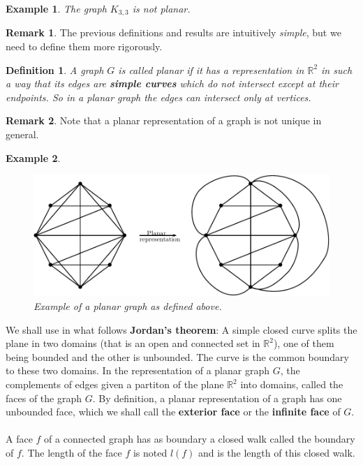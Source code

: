 \documentclass[12pt,a4paper]{article}
\newtheorem{defn}{Definition}[section]
\newtheorem{exmp}{Example}[section]
\theoremstyle{definition}
\newtheorem{rem}{Remark}[section]
\begin{document}
\newpage
\begin{exmp} The graph $K_{3,3}$ is not planar.
\end{exmp}
\begin{rem}The previous definitions and results are intuitively \textit{simple}, but we need to define them more rigorously.
\end{rem}
\begin{defn} A graph $G$ is called planar if it has a representation in $\mathbb{R}^2$ in such a way that its edges are \textbf{simple curves} which do not intersect except at their endpoints. So in a planar graph the edges can intersect only at vertices. 
\end{defn}
\begin{rem} Note that a planar representation of a graph is not unique in general. 
\end{rem}
\begin{exmp} \
\begin{figure}[hbtp]
\centering
\includegraphics[scale=.8]{images/graph48.pdf}
\caption{Example of a planar graph as defined above.}
\end{figure}
\end{exmp}
We shall use in what follows \textbf{Jordan's theorem}: A simple closed curve splits the plane in two domains (that is an open and connected set  in $\mathbb{R}^2$), one of them being bounded and the other is unbounded. The curve is the common boundary to these two domains. In the representation of a planar graph $G$, the complements of edges given a partiton of the plane $\mathbb{R}^2$ into domains, called the faces of the graph $G$. By definition,  a planar representation of a graph has one unbounded face,  which we shall call the \textbf{exterior face} or the \textbf{infinite face} of $G$. 
\\\\
A face $f$ of a connected graph has as boundary a closed walk called the boundary of $f$. The length of the face $f$ is noted $l(f)$ and is the length of this closed walk. \newpage
\end{document}
